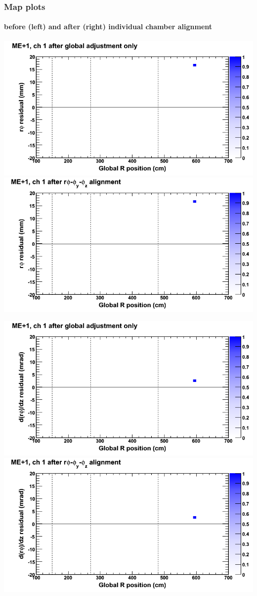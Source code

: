 \documentclass[compress]{beamer}
\begin{document}
\begin{frame}
\frametitle{Map plots}
\framesubtitle{before (left) and after (right) individual chamber alignment}
\includegraphics[width=0.5\linewidth]{ringmapplots_3dof/before_CSCvsr_mep1ch01_x.png} \includegraphics[width=0.5\linewidth]{ringmapplots_3dof/after_CSCvsr_mep1ch01_x.png}

\includegraphics[width=0.5\linewidth]{ringmapplots_3dof/before_CSCvsr_mep1ch01_dxdz.png} \includegraphics[width=0.5\linewidth]{ringmapplots_3dof/after_CSCvsr_mep1ch01_dxdz.png}
\end{frame}
\end{document}
